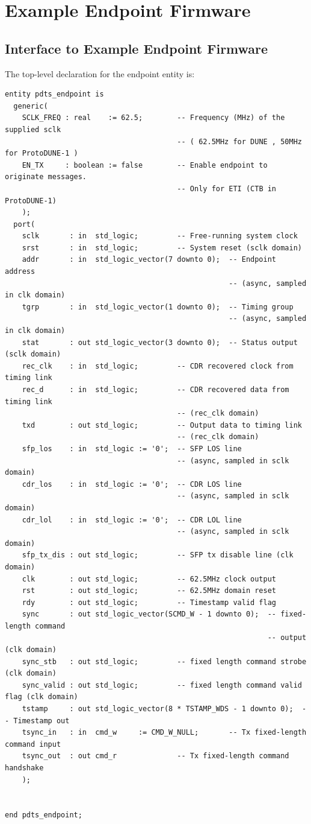 \documentclass[a4paper,11pt]{article}
\begin{document}
\section{Example Endpoint Firmware}

\subsection{Interface to Example Endpoint Firmware }

The top-level declaration for the endpoint entity is:

\begin{verbatim}
entity pdts_endpoint is
  generic(
    SCLK_FREQ : real    := 62.5;        -- Frequency (MHz) of the supplied sclk
                                        -- ( 62.5MHz for DUNE , 50MHz for ProtoDUNE-1 )
    EN_TX     : boolean := false        -- Enable endpoint to originate messages.
                                        -- Only for ETI (CTB in ProtoDUNE-1)
    );
  port(
    sclk       : in  std_logic;         -- Free-running system clock
    srst       : in  std_logic;         -- System reset (sclk domain)
    addr       : in  std_logic_vector(7 downto 0);  -- Endpoint address
                                                    -- (async, sampled in clk domain)
    tgrp       : in  std_logic_vector(1 downto 0);  -- Timing group
                                                    -- (async, sampled in clk domain)
    stat       : out std_logic_vector(3 downto 0);  -- Status output (sclk domain)
    rec_clk    : in  std_logic;         -- CDR recovered clock from timing link
    rec_d      : in  std_logic;         -- CDR recovered data from timing link
                                        -- (rec_clk domain)
    txd        : out std_logic;         -- Output data to timing link
                                        -- (rec_clk domain)
    sfp_los    : in  std_logic := '0';  -- SFP LOS line
                                        -- (async, sampled in sclk domain)
    cdr_los    : in  std_logic := '0';  -- CDR LOS line
                                        -- (async, sampled in sclk domain)
    cdr_lol    : in  std_logic := '0';  -- CDR LOL line
                                        -- (async, sampled in sclk domain)
    sfp_tx_dis : out std_logic;         -- SFP tx disable line (clk domain)
    clk        : out std_logic;         -- 62.5MHz clock output
    rst        : out std_logic;         -- 62.5MHz domain reset
    rdy        : out std_logic;         -- Timestamp valid flag
    sync       : out std_logic_vector(SCMD_W - 1 downto 0);  -- fixed-length command
                                                             -- output (clk domain)
    sync_stb   : out std_logic;         -- fixed length command strobe (clk domain)
    sync_valid : out std_logic;         -- fixed length command valid flag (clk domain)
    tstamp     : out std_logic_vector(8 * TSTAMP_WDS - 1 downto 0);  -- Timestamp out
    tsync_in   : in  cmd_w     := CMD_W_NULL;       -- Tx fixed-length command input
    tsync_out  : out cmd_r              -- Tx fixed-length command handshake
    );


end pdts_endpoint;
\end{verbatim}
\end{document}
